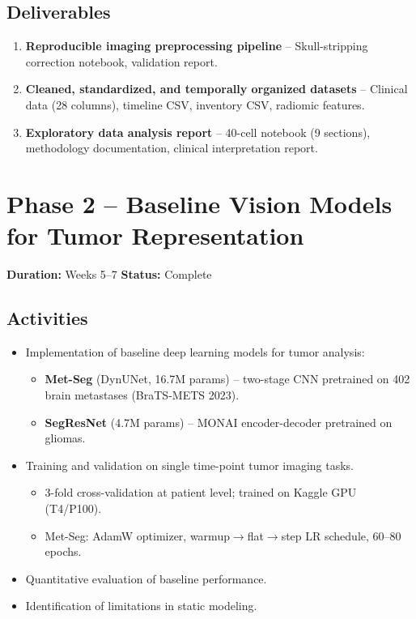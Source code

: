 \documentclass[10pt,a4paper]{article}
\begin{document}
\subsection*{Deliverables}
\begin{enumerate}[nosep, leftmargin=1.5em]
    \item \textbf{Reproducible imaging preprocessing pipeline} -- Skull-stripping correction notebook, validation report.
    \item \textbf{Cleaned, standardized, and temporally organized datasets} -- Clinical data (28 columns), timeline CSV, inventory CSV, radiomic features.
    \item \textbf{Exploratory data analysis report} -- 40-cell notebook (9 sections), methodology documentation, clinical interpretation report.
\end{enumerate}

\section{Phase 2 -- Baseline Vision Models for Tumor Representation}

\textbf{Duration:} Weeks 5--7 \hfill \textbf{Status:} Complete

\subsection*{Activities}
\begin{itemize}[nosep, leftmargin=1.5em]
    \item Implementation of baseline deep learning models for tumor analysis:
    \begin{itemize}[nosep, leftmargin=1em]
        \item \textbf{Met-Seg} (DynUNet, 16.7M params) -- two-stage CNN pretrained on 402 brain metastases (BraTS-METS 2023).
        \item \textbf{SegResNet} (4.7M params) -- MONAI encoder-decoder pretrained on gliomas.
    \end{itemize}
    \item Training and validation on single time-point tumor imaging tasks.
    \begin{itemize}[nosep, leftmargin=1em]
        \item 3-fold cross-validation at patient level; trained on Kaggle GPU (T4/P100).
        \item Met-Seg: AdamW optimizer, warmup$\rightarrow$flat$\rightarrow$step LR schedule, 60--80 epochs.
    \end{itemize}
    \item Quantitative evaluation of baseline performance.
    \item Identification of limitations in static modeling.
\end{itemize}
\end{document}
